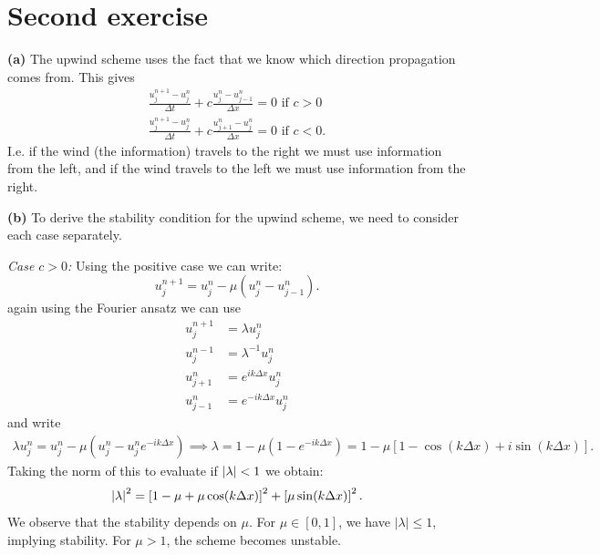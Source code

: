 \section{Second exercise}

\textbf{(a)} The upwind scheme uses the fact that we know which direction propagation comes from. This gives 
\begin{align}
    \frac{u_j^{n+1}-u_j^{n}}{\Delta t} + c \frac{u_j^n-u_{j-1}^n}{\Delta x}=0 \text{ if $c>0$} \\ 
    \frac{u_j^{n+1}-u_j^{n}}{\Delta t} + c \frac{u_{j+1}^n-u_j^n}{\Delta x}=0 \text{ if $c<0$}.
    \label{eq:upwind1}
\end{align}
I.e. if the wind (the information) travels to the right we must use information from the left, and if the wind travels to the left we must use information from the right.

\textbf{(b)} To derive the stability condition for the upwind scheme, we need to consider each case separately. 

\textit{Case $c>0$:} Using the positive case we can write: 
\begin{equation}
   u_j^{n+1} = u_j^n - \mu \left(u_j^n-u_{j-1}^n\right).
\end{equation}
again using the Fourier ansatz we can use
\begin{align*}
    u_j^{n+1} &= \lambda u_j^n \\ 
    u_j^{n-1} &= \lambda^{-1} u_j^n \\
    u_{j+1}^n &= e^{ik\Delta x} u_j^n \\ 
    u_{j-1}^n &= e^{-ik\Delta x} u_j^n 
\end{align*}
and write 
\begin{eqnarray}
    \lambda u_j^n = u_j^n -\mu\left(u_j^n-u_j^n e^{-ik\Delta x}\right) \implies \lambda = 1-\mu\left(1-e^{-ik\Delta x}\right)=1-\mu\left[1-\cos(k\Delta x)+i\sin(k\Delta x)\right].
\end{eqnarray}
Taking the norm of this to evaluate if $\left| \lambda \right|<1$ we obtain: 
\begin{equation*}
    \left| \lambda \right|^2 = \left[1-\mu+\mu\cos(k\Delta x)\right]^2 + \left[\mu\sin(k\Delta x)\right]^2.
\end{equation*}
We observe that the stability depends on $\mu$. For $\mu \in [0,1]$, we have $|\lambda| \leq 1$, implying stability. For $\mu > 1$, the scheme becomes unstable.

